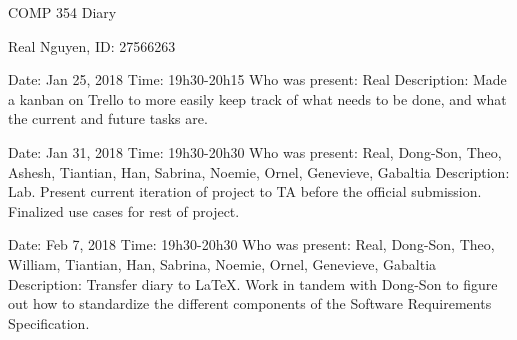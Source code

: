\documentclass{article}
\begin{document}
 
\begin{center}
    COMP 354 Diary
\end{center}
 
\begin{center}
    Real Nguyen, ID: 27566263
\end{center}
 
\begin{flushleft}
Date: Jan 25, 2018 \newline
Time: 19h30-20h15 \newline
Who was present: Real\newline
Description: Made a kanban on Trello to more easily keep track of what needs to be done, and what the current and future tasks are.\newline
\end{flushleft}
 
\begin{flushleft}
Date: Jan 31, 2018 \newline
Time: 19h30-20h30 \newline
Who was present: Real, Dong-Son, Theo, Ashesh, Tiantian, Han, Sabrina, Noemie, Ornel, Genevieve, Gabaltia\newline
Description: Lab. Present current iteration of project to TA before the official submission. Finalized use cases for rest of project.\newline
\end{flushleft} 
 
\begin{flushleft}
Date: Feb 7, 2018\newline
Time: 19h30-20h30\newline
Who was present: Real, Dong-Son, Theo, William, Tiantian, Han, Sabrina, Noemie, Ornel, Genevieve, Gabaltia\newline
Description: Transfer diary to LaTeX. Work in tandem with Dong-Son to figure out how to standardize the different components of the Software Requirements Specification.\newline
\end{flushleft}
 
\end{document}
